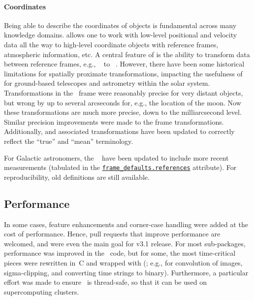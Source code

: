 \documentclass[modern]{aastex631}
\begin{document}
\paragraph{Coordinates}

Being able to describe the coordinates of objects is
fundamental across many knowledge domains. \astropycoordinates allows one to
work with low-level positional and velocity data all the way to high-level
coordinate objects with reference frames, atmospheric information, etc. A
central feature of \astropycoordinates is the ability to transform data between
reference frames, e.g., \astropyICRS\ \citep{ICRS:1997} to \astropyGalacticLSR\
\citep{GalacticLSR:2010}. However, there have been some historical limitations
for spatially proximate transformations, impacting the usefulness of
\astropycoordinates for ground-based telescopes and astrometry within the
solar system. Transformations in the \astropyAltAz\ frame were reasonably
precise for very distant objects, but wrong by up to several arcseconds for,
e.g., the location of the moon. Now these transformations are much more precise,
down to the milliarcsecond level. Similar precision improvements were made to
the
frame transformations. Additionally,
and associated transformations have been updated to correctly reflect the ``true''
and ``mean'' terminology.

For Galactic astronomers, the \astropyGalactocentric\
have been updated to include more recent measurements (tabulated in the
\href{https://docs.astropy.org/en/stable/api/astropy.coordinates.galactocentric_frame_defaults.html#astropy.coordinates.galactocentric_frame_defaults.references}{\texttt{frame\_defaults.references}}
attribute). For reproducibility, old definitions are still available.


\subsection{Performance} \label{sec:core-features-performance}

In some cases, feature enhancements and corner-case handling were added
at the cost of performance.
Hence, \github pull requests that improve performance are welcomed, and were
even the main goal for v3.1 release. For most sub-packages, performance was
improved in the \python\ code, but for some, the most time-critical pieces were
rewritten in~C and wrapped with \package{Cython} (\citealt{cython}; e.g., for
convolution of images, sigma-clipping, and converting time strings to binary).
Furthermore, a particular effort was made to ensure \astropypkg\ is thread-safe,
so that it can be used on supercomputing clusters.
\end{document}
